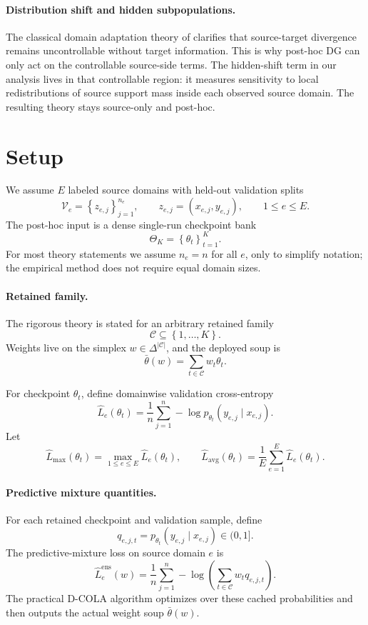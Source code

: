 \documentclass{article}
\theoremstyle{definition}
\newcommand{\cC}{\mathcal{C}}
\newcommand{\cV}{\mathcal{V}}
\newcommand{\dcola}{\textup{\textsc{D-COLA}}}
\newcommand{\simplex}{\Delta}
\newcommand{\paren}[1]{\left( #1 \right)}
\newcommand{\braces}[1]{\left\{ #1 \right\}}
\newcommand{\thetaw}{\bar{\theta}(w)}
\begin{document}
\paragraph{Distribution shift and hidden subpopulations.}
The classical domain adaptation theory of \citet{ben2010theory} clarifies that source-target divergence remains uncontrollable without target information. This is why post-hoc DG can only act on the controllable source-side terms. The hidden-shift term in our analysis lives in that controllable region: it measures sensitivity to local redistributions of source support mass inside each observed source domain. The resulting theory stays source-only and post-hoc.

\section{Setup}
\label{sec:setup}

We assume \(E\) labeled source domains with held-out validation splits
\[
\cV_e = \braces{z_{e,j}}_{j=1}^{n_e},
\qquad
z_{e,j}=(x_{e,j}, y_{e,j}),
\qquad
1 \le e \le E.
\]
The post-hoc input is a dense single-run checkpoint bank
\[
\Theta_K = \braces{\theta_t}_{t=1}^{K}.
\]
For most theory statements we assume \(n_e=n\) for all \(e\), only to simplify notation; the empirical method does not require equal domain sizes.

\paragraph{Retained family.}
The rigorous theory is stated for an arbitrary retained family
\[
\cC \subseteq \braces{1,\dots,K}.
\]
Weights live on the simplex \(w\in\simplex^{|\cC|}\), and the deployed soup is
\[
\thetaw = \sum_{t\in\cC} w_t \theta_t.
\]

For checkpoint \(\theta_t\), define domainwise validation cross-entropy
\[
\widehat L_e(\theta_t)
=
\frac{1}{n}\sum_{j=1}^{n}
-\log p_{\theta_t}(y_{e,j}\mid x_{e,j}).
\]
Let
\[
\widehat L_{\max}(\theta_t) = \max_{1\le e\le E}\widehat L_e(\theta_t),
\qquad
\widehat L_{\mathrm{avg}}(\theta_t)=\frac{1}{E}\sum_{e=1}^{E}\widehat L_e(\theta_t).
\]

\paragraph{Predictive mixture quantities.}
For each retained checkpoint and validation sample, define
\[
q_{e,j,t} = p_{\theta_t}(y_{e,j}\mid x_{e,j}) \in (0,1].
\]
The predictive-mixture loss on source domain \(e\) is
\begin{equation}
\widehat L_e^{\mathrm{ens}}(w)
=
\frac{1}{n}\sum_{j=1}^{n}
-\log\paren{\sum_{t\in\cC} w_t q_{e,j,t}}.
\label{eq:ensloss}
\end{equation}
The practical \dcola{} algorithm optimizes over these cached probabilities and then outputs the actual weight soup \(\thetaw\).
\end{document}
